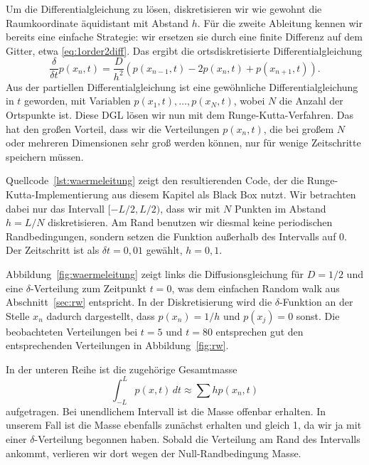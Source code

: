 Um die Differentialgleichung zu lösen, diskretisieren wir wie gewohnt
die Raumkoordinate äquidistant mit Abstand $h$. Für die zweite
Ableitung kennen wir bereits eine einfache Strategie: wir ersetzen sie
durch eine finite Differenz auf dem Gitter, etwa
\eqref{eq:1order2diff}. Das ergibt die ortsdiskretisierte
Differentialgleichung
\begin{equation}
  \frac{\delta}{\delta t} p(x_n, t) =
  \frac{D}{h^2} \left(p(x_{n-1}, t) - 2 p(x_n, t) + p(x_{n+1}, t)\right).
\end{equation}
Aus der partiellen Differentialgleichung ist eine gewöhnliche
Differentialgleichung in $t$ geworden, mit Variablen
$p(x_1,t),\ldots,p(x_N, t)$, wobei $N$ die Anzahl der Ortspunkte
ist. Diese DGL lösen wir nun mit dem Runge-Kutta-Verfahren. Das hat
den großen Vorteil, dass wir die Verteilungen $p(x_n, t)$, die bei
großem $N$ oder mehreren Dimensionen sehr groß werden können, nur für
wenige Zeitschritte speichern müssen.

Quellcode~\ref{lst:waermeleitung} zeigt den resultierenden Code, der
die Runge-Kutta-Implementierung aus diesem Kapitel als Black Box
nutzt. Wir betrachten dabei nur das Intervall $[-L/2,L/2)$, dass wir
mit $N$ Punkten im Abstand $h=L/N$ diskretisieren. Am Rand benutzen
wir diesmal keine periodischen Randbedingungen, sondern setzen die
Funktion außerhalb des Intervalls auf 0. Der Zeitschritt ist als
$\delta t=0,01$ gewählt, $h=0,1$.

Abbildung~\ref{fig:waermeleitung} zeigt links die Diffusionsgleichung
für $D=1/2$ und eine $\delta$-Verteilung zum Zeitpunkt $t=0$, was dem
einfachen Random walk aus Abschnitt~\ref{sec:rw} entspricht. In der
Diskretisierung wird die $\delta$-Funktion an der Stelle $x_n$ dadurch
dargestellt, dass $p(x_n)=1/h$ und $p(x_j)=0$ sonst. Die beobachteten
Verteilungen bei $t=5$ und $t=80$ entsprechen gut den entsprechenden
Verteilungen in Abbildung~\ref{fig:rw}.

In der unteren Reihe ist die zugehörige Gesamtmasse
\begin{equation}
  \int_{-L}^L p(x, t)\, dt \approx \sum h p(x_n, t)
\end{equation}
aufgetragen. Bei unendlichem Intervall ist die Masse offenbar
erhalten. In unserem Fall ist die Masse ebenfalls zunächst erhalten
und gleich 1, da wir ja mit einer $\delta$-Verteilung begonnen
haben. Sobald die Verteilung am Rand des Intervalls ankommt, verlieren
wir dort wegen der Null-Randbedingung Masse.

%


